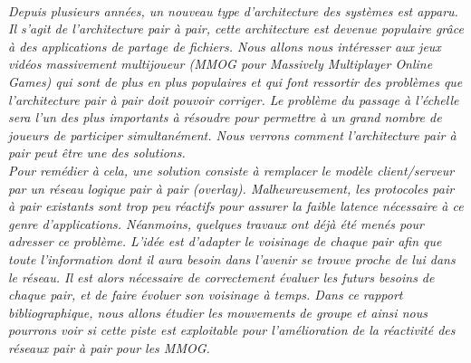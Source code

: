 \\
	\par \textit{Depuis plusieurs années, un nouveau type d'architecture des systèmes est apparu. Il s'agit de l'architecture pair à pair, cette architecture est devenue populaire grâce à des applications de partage de fichiers. Nous allons nous intéresser aux jeux vidéos massivement multijoueur (MMOG pour Massively Multiplayer Online Games) qui sont de plus en plus populaires et qui font ressortir des problèmes que l'architecture pair à pair doit pouvoir corriger. Le problème du passage à l'échelle sera l'un des plus importants à résoudre pour permettre à un grand nombre de joueurs de participer simultanément. Nous verrons comment l'architecture pair à pair peut être une des solutions.\\ 
	 Pour remédier à cela, une solution consiste à remplacer le modèle client/serveur par un réseau logique pair à pair (overlay). Malheureusement, les protocoles pair à pair existants sont trop peu réactifs pour assurer la faible latence nécessaire à ce genre d’applications. Néanmoins, quelques travaux ont déjà été menés pour adresser ce problème. L’idée est d’adapter le voisinage de chaque pair afin que toute l’information dont il aura besoin dans l'avenir se trouve proche de lui dans le réseau. Il est alors nécessaire de correctement évaluer les futurs besoins de chaque pair, et de faire évoluer son voisinage à temps. Dans ce rapport bibliographique, nous allons étudier les mouvements de groupe et ainsi nous pourrons voir si cette piste est exploitable pour l'amélioration de la réactivité des réseaux pair à pair pour les MMOG.}\\
